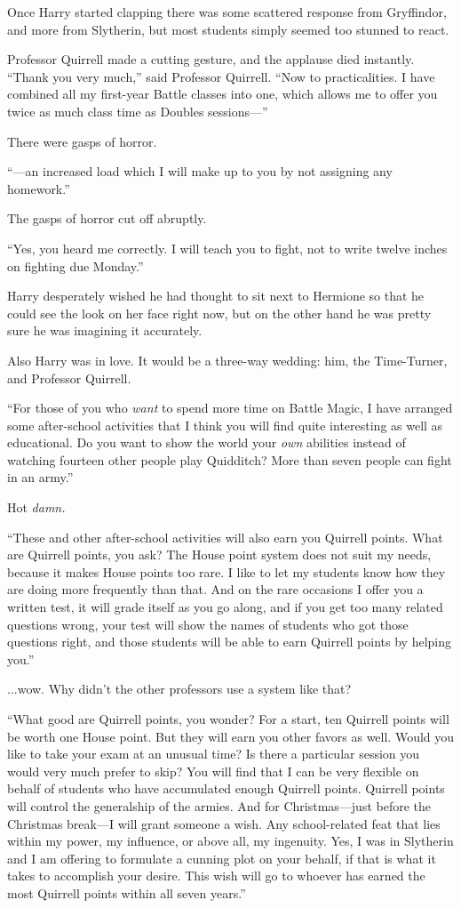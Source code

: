 Once Harry started clapping there was some scattered response from Gryffindor, and more from Slytherin, but most students simply seemed too stunned to react.

Professor Quirrell made a cutting gesture, and the applause died instantly. “Thank you very much,” said Professor Quirrell. “Now to practicalities. I have combined all my first-year Battle classes into one, which allows me to offer you twice as much class time as Doubles sessions—”

There were gasps of horror.

“—an increased load which I will make up to you by not assigning any homework.”

The gasps of horror cut off abruptly.

“Yes, you heard me correctly. I will teach you to fight, not to write twelve inches on fighting due Monday.”

Harry desperately wished he had thought to sit next to Hermione so that he could see the look on her face right now, but on the other hand he was pretty sure he was imagining it accurately.

Also Harry was in love. It would be a three-way wedding: him, the Time-Turner, and Professor Quirrell.

“For those of you who \emph{want} to spend more time on Battle Magic, I have arranged some after-school activities that I think you will find quite interesting as well as educational. Do you want to show the world your \emph{own} abilities instead of watching fourteen other people play Quidditch? More than seven people can fight in an army.”

Hot \emph{damn.}

“These and other after-school activities will also earn you Quirrell points. What are Quirrell points, you ask? The House point system does not suit my needs, because it makes House points too rare. I like to let my students know how they are doing more frequently than that. And on the rare occasions I offer you a written test, it will grade itself as you go along, and if you get too many related questions wrong, your test will show the names of students who got those questions right, and those students will be able to earn Quirrell points by helping you.”

...wow. Why didn’t the other professors use a system like that?

“What good are Quirrell points, you wonder? For a start, ten Quirrell points will be worth one House point. But they will earn you other favors as well. Would you like to take your exam at an unusual time? Is there a particular session you would very much prefer to skip? You will find that I can be very flexible on behalf of students who have accumulated enough Quirrell points. Quirrell points will control the generalship of the armies. And for Christmas—just before the Christmas break—I will grant someone a wish. Any school-related feat that lies within my power, my influence, or above all, my ingenuity. Yes, I was in Slytherin and I am offering to formulate a cunning plot on your behalf, if that is what it takes to accomplish your desire. This wish will go to whoever has earned the most Quirrell points within all seven years.”

